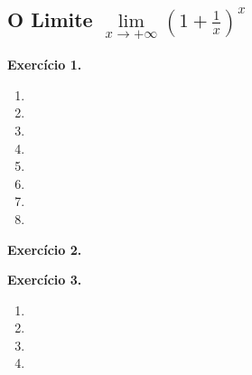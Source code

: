 \documentclass[12pt,a4paper]{article}
\begin{document}
\subsection{O Limite $\lim\limits_{x \to +\infty} \left(1 + \frac{1}{x}\right)^x$}
\vspace{0.5cm}
\noindent\textbf{Exercício 1.}
\begin{enumerate}
    \renewcommand{\theenumi}{\alph{enumi}}
    \renewcommand{\labelenumi}{\theenumi)}
    \item 
    \item 
    \item 
    \item 
    \item 
    \item 
    \item 
    \item 
\end{enumerate}

\vspace{0.5cm}
\noindent\textbf{Exercício 2.}

\vspace{0.5cm}
\noindent\textbf{Exercício 3.}
\begin{enumerate}
    \renewcommand{\theenumi}{\alph{enumi}}
    \renewcommand{\labelenumi}{\theenumi)}
    \item 
    \item 
    \item 
    \item 
\end{enumerate}
\end{document}
